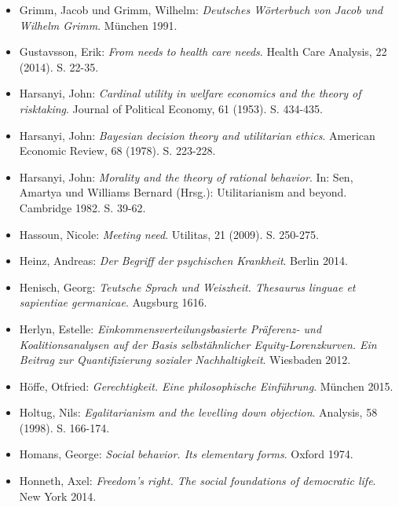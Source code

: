 \documentclass[a4paper]{thesis}
\begin{document}
\begin{itemize}[leftmargin=1.5em,label={},itemindent=-1.5em, itemsep=-1ex]
\item Grimm, Jacob und Grimm, Wilhelm: \textit{Deutsches Wörterbuch von Jacob und Wilhelm Grimm}. München 1991.

\item Gustavsson, Erik: \textit{From needs to health care needs}. Health Care Analysis, 22 (2014). S. 22-35.

\item Harsanyi, John: \textit{Cardinal utility in welfare economics and the theory of risktaking}. Journal of Political Economy, 61 (1953). S. 434-435.

\item Harsanyi, John: \textit{Bayesian decision theory and utilitarian ethics}. American Economic Review, 68 (1978). S. 223-228.

\item Harsanyi, John: \textit{Morality and the theory of rational behavior}. In: Sen, Amartya und Williams Bernard (Hrsg.): Utilitarianism and beyond. Cambridge 1982. S. 39-62.

\item Hassoun, Nicole: \textit{Meeting need}. Utilitas, 21 (2009). S. 250-275.

\item Heinz, Andreas: \textit{Der Begriff der psychischen Krankheit}. Berlin 2014.

\item Henisch, Georg: \textit{Teutsche Sprach und Weiszheit. Thesaurus linguae et sapientiae germanicae}. Augsburg 1616.

\item Herlyn, Estelle: \textit{Einkommensverteilungsbasierte Präferenz- und Koalitionsanalysen auf der Basis selbstähnlicher Equity-Lorenzkurven. Ein Beitrag zur Quantifizierung sozialer Nachhaltigkeit}. Wiesbaden 2012.

\item Höffe, Otfried: \textit{Gerechtigkeit. Eine philosophische Einführung}. München 2015.

\item Holtug, Nils: \textit{Egalitarianism and the levelling down objection}. Analysis, 58 (1998). S. 166-174.

\item Homans, George: \textit{Social behavior. Its elementary forms}. Oxford 1974.

\item Honneth, Axel: \textit{Freedom's right. The social foundations of democratic life}. New York 2014.


\end{itemize}
\end{document}

